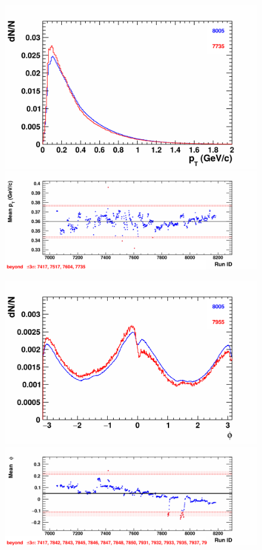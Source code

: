     \begin{figure}[H]
        \begin{center}
            \includegraphics[width=0.35\linewidth]{../pict/QA_RunByRun_24.12/H1/nVtxTr_h2_RunId_tr_pT.png}
            \includegraphics[width=0.60\linewidth]{../pict/QA_RunByRun_24.12/nVtxTr_h2_RunId_tr_pT.png}

            \includegraphics[width=0.35\linewidth]{../pict/QA_RunByRun_24.12/H1/nVtxTr_h2_RunId_tr_phi.png}
            \includegraphics[width=0.60\linewidth]{../pict/QA_RunByRun_24.12/nVtxTr_h2_RunId_tr_phi.png}


\end{center}
\end{figure}
